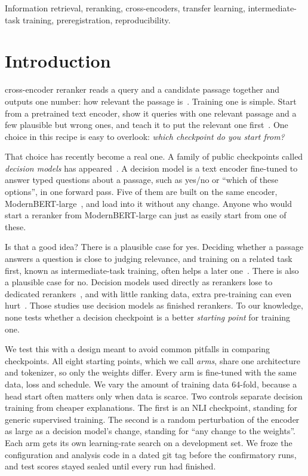 \documentclass[journal]{IEEEtran}
\begin{document}
\begin{IEEEkeywords}
Information retrieval, reranking, cross-encoders, transfer learning, intermediate-task training, preregistration, reproducibility.
\end{IEEEkeywords}

\section{Introduction}

 cross-encoder reranker reads a query and a candidate passage together and outputs one number: how relevant the passage is~\cite{nogueira2019passage,lin2021survey}. Training one is simple. Start from a pretrained text encoder, show it queries with one relevant passage and a few plausible but wrong ones, and teach it to put the relevant one first~\cite{gao2021rethink}. One choice in this recipe is easy to overlook: \emph{which checkpoint do you start from?}

That choice has recently become a real one. A family of public checkpoints called \emph{decision models} has appeared~\cite{rastogi2026smallheads,dinzinger2026systemone}. A decision model is a text encoder fine-tuned to answer typed questions about a passage, such as yes/no or ``which of these options'', in one forward pass. Five of them are built on the same encoder, ModernBERT-large~\cite{warner2024modernbert}, and load into it without any change. Anyone who would start a reranker from ModernBERT-large can just as easily start from one of these.

Is that a good idea? There is a plausible case for yes. Deciding whether a passage answers a question is close to judging relevance, and training on a related task first, known as intermediate-task training, often helps a later one~\cite{phang2018stilts,pruksachatkun2020intermediate,vu2020transferability,garg2020tanda}. There is also a plausible case for no. Decision models used directly as rerankers lose to dedicated rerankers~\cite{dinzinger2026systemone,li2026replace}, and with little ranking data, extra pre-training can even hurt~\cite{zhang2020littlebit}. Those studies use decision models as finished rerankers. To our knowledge, none tests whether a decision checkpoint is a better \emph{starting point} for training one.

We test this with a design meant to avoid common pitfalls in comparing checkpoints. All eight starting points, which we call \emph{arms}, share one architecture and tokenizer, so only the weights differ. Every arm is fine-tuned with the same data, loss and schedule. We vary the amount of training data 64-fold, because a head start often matters only when data is scarce. Two controls separate decision training from cheaper explanations. The first is an NLI checkpoint, standing for generic supervised training. The second is a random perturbation of the encoder as large as a decision model's change, standing for ``any change to the weights''. Each arm gets its own learning-rate search on a development set. We froze the configuration and analysis code in a dated git tag before the confirmatory runs, and test scores stayed sealed until every run had finished.
\end{document}
